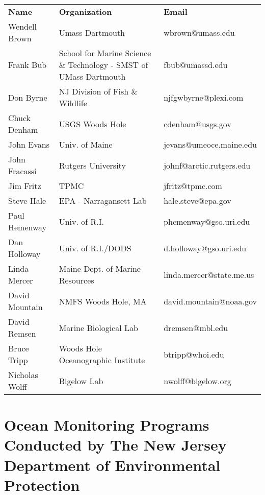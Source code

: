 \begin{center}
  \begin{tabular}[t]{lp{2.0in}l} \\ 
\textbf{Name} & \textbf{Organization} & \textbf{Email} \\
Wendell Brown &                 Umass Dartmouth & wbrown@umass.edu \\
Frank Bub &                     School for Marine Science \& Technology - SMST of UMass Dartmouth & fbub@umassd.edu \\
Don Byrne &                     NJ Division of Fish \& Wildlife& njfgwbyrne@plexi.com \\
Chuck Denham &                  USGS Woods Hole &       cdenham@usgs.gov \\
John Evans &                    Univ. of Maine          &       jevans@umeoce.maine.edu \\
John Fracassi &                 Rutgers University      &       johnf@arctic.rutgers.edu \\
Jim Fritz &                     TPMC                    &       jfritz@tpmc.com \\
Steve Hale &                    EPA - Narragansett Lab &         hale.steve@epa.gov \\
Paul Hemenway &         Univ. of R.I.           &       phemenway@gso.uri.edu \\
Dan Holloway &                  Univ. of R.I./DODS &            d.holloway@gso.uri.edu \\
Linda Mercer &                  Maine Dept. of Marine Resources & linda.mercer@state.me.us \\
David Mountain &                NMFS Woods Hole, MA & david.mountain@noaa.gov \\
David Remsen &                  Marine Biological Lab   &       dremsen@mbl.edu \\
Bruce Tripp &                   Woods Hole Oceanographic Institute & btripp@whoi.edu \\
Nicholas Wolff &                        Bigelow Lab             &       nwolff@bigelow.org \\
  \end{tabular}
\end{center}

\section{Ocean Monitoring Programs Conducted by
The New Jersey Department of Environmental Protection}
\label{IV,NJ}

